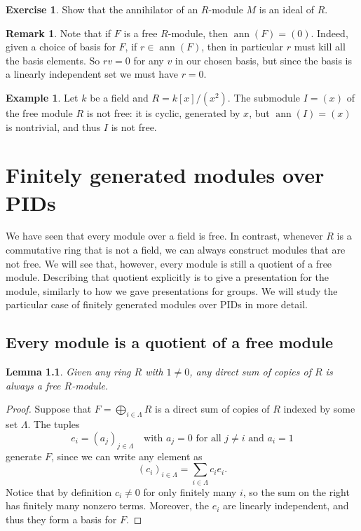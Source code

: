 \documentclass[12pt]{report}
\newtheorem{lemma}[theorem]{Lemma}
\numberwithin{equation}{section}
\numberwithin{theorem}{chapter}
\theoremstyle{definition}
\newtheorem{example}[theorem]{Example}
\newtheorem{exercise}{Exercise}
\newtheorem*{basic properties}{Basic Properties}
\newtheorem*{Important Remark}{Important Remark}
\newtheorem{remark}[theorem]{Remark}
\DeclareMathOperator{\ann}{ann}
\begin{document}
\begin{exercise}
	Show that the annihilator of an $R$-module $M$ is an ideal of $R$.
\end{exercise}


\begin{remark}
	Note that if $F$ is a free $R$-module, then $\ann(F) = (0)$. Indeed, given a choice of basis for $F$, if $r \in \ann(F)$, then in particular $r$ must kill all the basis elements. So $rv = 0$ for any $v$ in our chosen basis, but since the basis is a linearly independent set we must have $r=0$.
\end{remark}


\begin{example}
	Let $k$ be a field and $R = k[x]/(x^2)$. The submodule $I = (x)$ of the free module $R$ is not free: it is cyclic, generated by $x$, but $\ann(I) = (x)$ is nontrivial, and thus $I$ is not free.
\end{example}




\chapter{Finitely generated modules over PIDs}

We have seen that every module over a field is free. In contrast, whenever $R$ is a commutative ring that is not a field, we can always construct modules that are not free. We will see that, however, every module is still a quotient of a free module. Describing that quotient explicitly is to give a presentation for the module, similarly to how we gave presentations for groups. We will study the particular case of finitely generated modules over PIDs in more detail.

\section{Every module is a quotient of a free module}\label{section mods quotients of free mods}




\begin{lemma}
	Given any ring $R$ with $1 \neq 0$, any direct sum of copies of $R$ is always a free $R$-module.
\end{lemma}

\begin{proof}
	Suppose that $F = \bigoplus_{i \in \Lambda} R$ is a direct sum of copies of $R$ indexed by some set $\Lambda$. The tuples 
	$$e_i = (a_{j})_{j \in \Lambda} \quad \textrm{with } a_j = 0 \textrm{ for all } j \neq i \textrm{ and } a_i = 1$$
	generate $F$, since we can write any element as 
	$$(c_i)_{i \in \Lambda} = \sum_{i \in \Lambda} c_i e_i.$$
	Notice that by definition $c_i \neq 0$ for only finitely many $i$, so the sum on the right has finitely many nonzero terms. Moreover, the $e_i$ are linearly independent, and thus they form a basis for $F$.
\end{proof}
\end{document}
